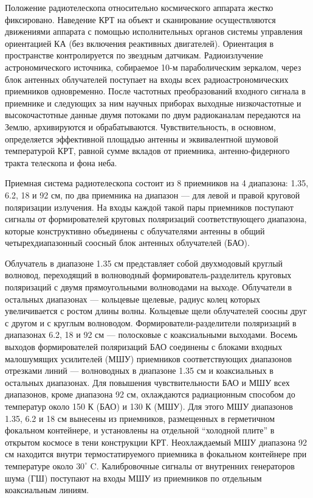 Положение радиотелескопа относительно космического аппарата
жестко фиксировано. Наведение КРТ на объект и сканирование
осуществляются движениями аппарата с помощью
исполнительных органов системы управления ориентацией КА
(без включения реактивных двигателей).
Ориентация в пространстве контролируется по звездным датчикам.
Радиоизлучение астрономического источника, собираемое 10-м
параболическим зеркалом,
через блок антенных облучателей поступает на входы всех радиоастрономических
приемников одновременно. После частотных преобразований входного сигнала
в приемнике и следующих за ним научных приборах
выходные низкочастотные и
высокочастотные данные двумя потоками по двум радиоканалам
передаются на Землю, архивируются и обрабатываются.
Чувствительность, в основном, определяется эффективной площадью
антенны и эквивалентной шумовой температурой КРТ, равной сумме
вкладов от приемника, антенно-фидерного тракта телескопа и фона неба.

Приемная система радиотелескопа состоит из 8 приемников
на 4 диапазона: 1.35, 6.2, 18 и 92 см, по два приемника на
диапазон --- для левой и правой круговой поляризации излучения.
На входы каждой такой пары приемников поступают сигналы от формирователей круговых
поляризаций соответствующего диапазона, которые конструктивно объединены с
облучателями антенны в общий четырехдиапазонный соосный блок антенных облучателей
(БАО).

Облучатель в диапазоне 1.35 см представляет собой двухмодовый круглый волновод,
переходящий в волноводный формирователь-разделитель круговых поляризаций
с двумя прямоугольными волноводами на выходе.
Облучатели в остальных диапазонах --- кольцевые щелевые, радиус колец которых
увеличивается с ростом длины волны. Кольцевые щели облучателей соосны друг с другом и с
круглым волноводом. Формирователи-разделители поляризаций в диапазонах
6.2, 18 и 92 см --- полосковые с коаксиальными выходами.
Восемь выходов формирователей поляризаций БАО соединены с блоками
входных малошумящих усилителей (МШУ) приемников соответствующих диапазонов
отрезками линий --- волноводных в диапазоне 1.35 см и коаксиальных в остальных
диапазонах. Для повышения чувствительности БАО и МШУ всех диапазонов,
кроме диапазона 92 см, охлаждаются радиационным способом до температур
около 150 К (БАО) и 130 К (МШУ). Для этого МШУ диапазонов 1.35, 6.2
и 18 см вынесены из приемников, размещенных в герметичном фокальном
контейнере, и установлены на отдельной ``холодной плите'' в открытом космосе
в тени конструкции КРТ. Неохлаждаемый МШУ диапазона 92 см
находится внутри термостатируемого приемника в фокальном контейнере при
температуре около $30^\circ$ C. Калибровочные сигналы от внутренних
генераторов шума (ГШ) поступают на входы МШУ из приемников по отдельным
коаксиальным линиям.


